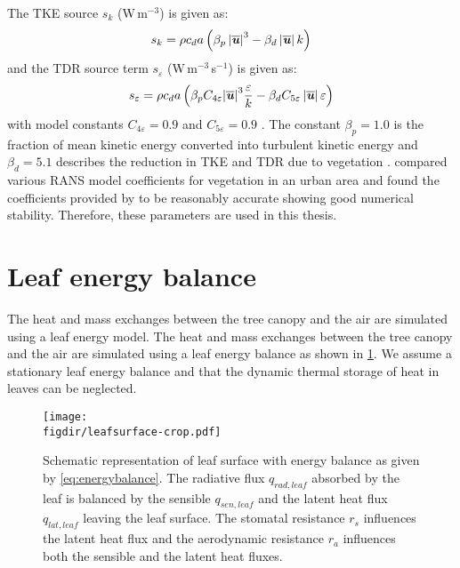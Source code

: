 The TKE source $s_k$ (W\,m$^{-3}$) is given as: 
\begin{equation}
s_k = \rho {c_d}a\left( \beta _p \left| \overline{\textbf{\textit{u}}} \right|^3 - \beta _d\left| \overline{\textbf{\textit{u}}} \right|k \right)
\label{eq:source_k}		 	
\end{equation}
and the TDR source term $s_{\varepsilon}$ (W\,m$^{-3}$\,s$^{-1}$) is given as:
\begin{equation}
s_\varepsilon = \rho {c_d}a\left( {{\beta _p}{C_{4\varepsilon }}{{\left| \overline{\textbf{\textit{u}}} \right|}^3}\frac{\varepsilon }{k} - {\beta _d}{C_{5\varepsilon }}\left| \overline{\textbf{\textit{u}}} \right|\varepsilon } \right)
\label{eq:source_eps}		 	
\end{equation}
with model constants $C_{4\varepsilon}=0.9$ and $C_{5\varepsilon}=0.9$ \citep{Katul2004, Kenjeres2013, Sanz2003}. The constant $\beta_p=1.0$ is the fraction of mean kinetic energy converted into turbulent kinetic energy and $\beta_d=5.1$ describes the reduction in TKE and TDR due to vegetation \citep{Sanz2003}. \cite{Kenjeres2013} compared various RANS model coefficients for vegetation in an urban area and found the coefficients provided by \cite{Katul2004} to be reasonably accurate showing good numerical stability. Therefore, these parameters are used in this thesis.

\section{Leaf energy balance}
\label{sec:leafenergy}

The heat and mass exchanges between the tree canopy and the air are simulated using a leaf energy model. The heat and mass exchanges between the tree canopy and the air are simulated using a leaf energy balance as shown in \cref{fig:leaf_energybalance}. We assume a stationary leaf energy balance and that the dynamic thermal storage of heat in leaves can be neglected.

\begin{figure}[h]
	\centering
	\texttt{[image: \\figdir/leafsurface-crop.pdf]}
	\caption{Schematic representation of leaf surface with energy balance as given by \cref{eq:energybalance}. The radiative flux $q_{\mathit{rad,leaf}}$  absorbed by the leaf is balanced by the sensible $q_{\mathit{sen,leaf}}$ and the latent heat flux $q_{\mathit{lat,leaf}}$ leaving the leaf surface. The stomatal resistance 
		$r_s$ influences the latent heat flux and the aerodynamic resistance $r_a$ influences both the sensible and the latent heat fluxes. }
	\label{fig:leaf_energybalance}
\end{figure}

